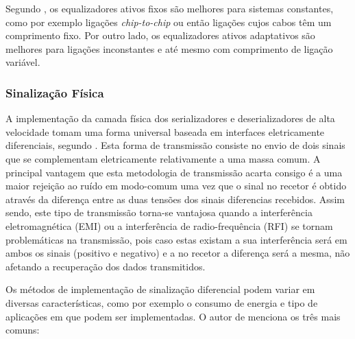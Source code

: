 Segundo \cite{R032}, os equalizadores ativos fixos são melhores para sistemas constantes, como por exemplo ligações \textit{chip-to-chip} ou então ligações cujos cabos têm um comprimento fixo. Por outro lado, os equalizadores ativos adaptativos são melhores para ligações inconstantes e até mesmo com comprimento de ligação variável.
%
%
%


\subsubsection*{Sinalização Física}


A implementação da camada física dos serializadores e deserializadores de alta velocidade tomam uma forma universal baseada em interfaces eletricamente diferenciais, segundo \cite{R032}. Esta forma de transmissão consiste no envio de dois sinais que se complementam eletricamente relativamente a uma massa comum. A principal vantagem que esta metodologia de transmissão acarta consigo é a uma maior rejeição ao ruído em modo-comum uma vez que o sinal no recetor é obtido através da diferença entre as duas tensões dos sinais diferencias recebidos. Assim sendo, este tipo de transmissão torna-se vantajosa quando a interferência eletromagnética (EMI) ou a interferência de radio-frequência (RFI) se tornam problemáticas na transmissão, pois caso estas existam a sua interferência será em ambos os sinais (positivo e negativo) e a no recetor a diferença será a mesma, não afetando a recuperação dos dados transmitidos.

Os métodos de implementação de sinalização diferencial podem variar em diversas características, como por exemplo o consumo de energia e tipo de aplicações em que podem ser implementadas. O autor de \cite{R032} menciona os três mais comuns:

